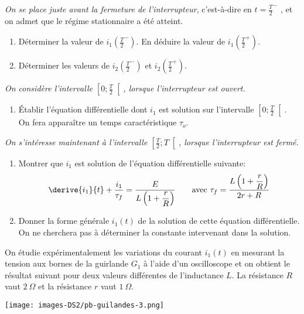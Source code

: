 \emph{On se place juste avant la fermeture de l'interrupteur},
c'est-à-dire en \(t = \frac{T}{2}^-\) , et on admet que le régime
stationnaire a été atteint.

\begin{enumerate}
\def\labelenumi{\arabic{enumi}.}
\setcounter{enumi}{8}
\item
  Déterminer la valeur de \(i_1\left(\frac{T}{2}^-\right)\). En déduire
  la valeur de \(i_1\left(\frac{T}{2}^+\right)\).
\item
  Déterminer les valeurs de \(i_2\left(\frac{T}{2}^-\right)\) et
  \(i_2\left(\frac{T}{2}^+\right)\).
\end{enumerate}

\emph{On considère l'intervalle \(\left[0 ; \frac{T}{2} \right[\),
lorsque l'interrupteur est ouvert.}

\begin{enumerate}
\def\labelenumi{\arabic{enumi}.}
\setcounter{enumi}{10}
\tightlist
\item
  Établir l'équation différentielle dont \(i_1\) est solution sur
  l'intervalle \(\left[0 ; \frac{T}{2} \right[\). On fera apparaître un
  temps caractéristique \(\tau_o\).
\end{enumerate}

\emph{On s'intéresse maintenant à l'intervalle
\(\left[ \frac{T}{2} ; T\right[\), lorsque l'interrupteur est fermé.}

\begin{enumerate}
\def\labelenumi{\arabic{enumi}.}
\setcounter{enumi}{11}
\item
  Montrer que \(i_1\) est solution de l'équation différentielle
  suivante:
  \[\derive{i_1}{t} + \dfrac{i_1}{\tau_f} = \dfrac{E}{L\left(1 + \dfrac{r}{R}\right)} \qquad \text{avec } \tau_f = \dfrac{L\left(1 + \dfrac{r}{R}\right)}{2r + R}\]
\item
  Donner la forme générale \(i_1(t)\) de la solution de cette équation
  différentielle. On ne cherchera pas à déterminer la constante
  intervenant dans la solution.
\end{enumerate}

On étudie expérimentalement les variations du courant \(i_1(t)\) en
mesurant la tension aux bornes de la guirlande \(G_1\) à l'aide d'un
oscilloscope et on obtient le résultat suivant pour deux valeurs
différentes de l'inductance \(L\). La résistance \(R\) vaut
\(2\ \Omega\) et la résistance \(r\) vaut \(1\ \Omega\).

\texttt{[image: images-DS2/pb-guilandes-3.png]}

